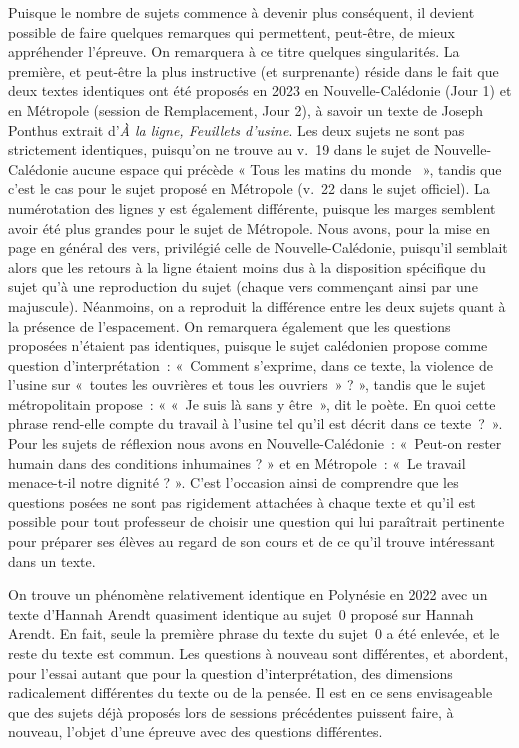 Puisque le nombre de sujets commence à devenir plus conséquent, il devient possible de faire quelques remarques qui permettent, peut-être, de mieux appréhender l'épreuve. On remarquera à ce titre quelques singularités. La première, et peut-être la plus instructive (et surprenante) réside dans le fait que deux textes identiques ont été proposés en 2023 en Nouvelle-Calédonie (Jour 1) et en Métropole (session de Remplacement, Jour 2), à savoir un texte de Joseph Ponthus extrait d'\textit{À la ligne, Feuillets d'usine}. Les deux sujets ne sont pas strictement identiques, puisqu'on ne trouve au v.~19 dans le sujet de Nouvelle-Calédonie aucune espace qui précède « Tous les matins du monde ~»{}, tandis que c'est le cas pour le sujet proposé en Métropole (v.~22 dans le sujet officiel). La numérotation des lignes y est également différente, puisque les marges semblent avoir été plus grandes pour le sujet de Métropole. Nous avons, pour la mise en page en général des vers, privilégié celle de Nouvelle-Calédonie, puisqu'il semblait alors que les retours à la ligne étaient moins dus à la disposition spécifique du sujet qu'à une reproduction du sujet (chaque vers commençant ainsi par une majuscule). Néanmoins, on a reproduit la différence entre les deux sujets quant à la présence de l'espacement. On remarquera également que les questions proposées n'étaient pas identiques, puisque le sujet calédonien propose comme question d'interprétation~: «~Comment s'exprime, dans ce texte, la violence de l'usine sur «~toutes les ouvrières et tous les ouvriers~» ? », tandis que le sujet métropolitain propose~: « «~Je suis là sans y être~», dit le poète. En quoi cette phrase rend-elle compte du travail à l'usine tel qu'il est décrit dans ce texte~?~»{}. Pour les sujets de réflexion nous avons en Nouvelle-Calédonie~: «~Peut-on rester humain dans des conditions inhumaines ? »  et en Métropole~: «~Le travail menace-t-il notre dignité ? ». C'est l'occasion ainsi de comprendre que les questions posées ne sont pas rigidement attachées à chaque texte et qu'il est possible pour tout professeur de choisir une question qui lui paraîtrait pertinente pour préparer ses élèves au regard de son cours et de ce qu'il trouve intéressant dans un texte.

On trouve un phénomène relativement identique en Polynésie en 2022 avec un texte d'Hannah Arendt quasiment identique au sujet~0 proposé sur Hannah Arendt. En fait, seule la première phrase du texte du sujet~0 a été enlevée, et le reste du texte est commun. Les questions à nouveau sont différentes, et abordent, pour l'essai autant que pour la question d'interprétation, des dimensions radicalement différentes du texte ou de la pensée. Il est en ce sens envisageable que des sujets déjà proposés lors de sessions précédentes puissent faire, à nouveau, l'objet d'une épreuve avec des questions différentes.

